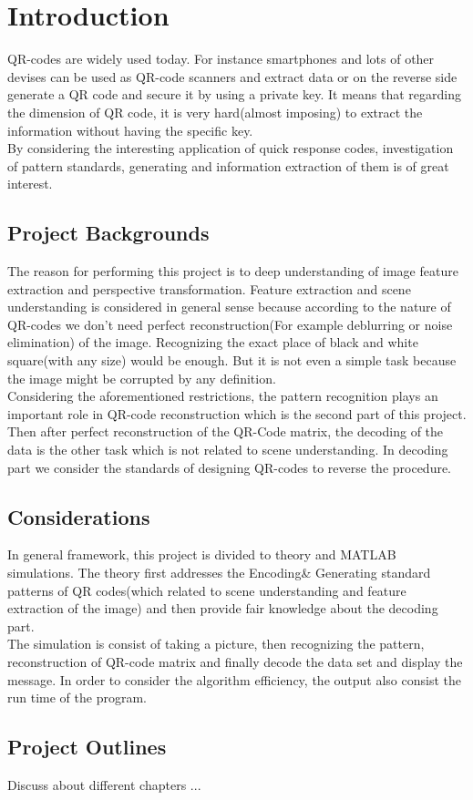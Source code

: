 \chapter{Introduction}

QR-codes are widely used today. For instance smartphones and lots of other devises can be used as QR-code scanners and extract data or on the reverse side generate a QR code and secure it by using a private key. It means that regarding the dimension of QR code, it is very hard(almost imposing) to extract the information without having the specific key.\\
By considering the interesting application of quick response codes, investigation of pattern standards, generating and information extraction of them is of great interest.


\section{Project Backgrounds}

The reason for performing this project is to deep understanding of image feature extraction and perspective transformation. Feature extraction and scene understanding is considered in general sense because according to the nature of QR-codes we don't need perfect reconstruction(For example deblurring or noise elimination) of the image. Recognizing the exact place of black and white square(with any size) would be enough. But it is not even a simple task because the image might be corrupted by any definition. \\
Considering the aforementioned restrictions, the pattern recognition plays an important role in QR-code reconstruction which is the second part of this project. Then after perfect reconstruction of the QR-Code matrix, the decoding of the data is the other task which is not related to scene understanding. In decoding part we consider the standards of designing QR-codes to reverse the procedure. 

\section{Considerations}

In general framework, this project is divided to theory and MATLAB simulations. The theory first addresses the Encoding\& Generating standard patterns of QR codes(which related to scene understanding and feature extraction of the image) and then provide fair knowledge about the decoding part. \\
The simulation is consist of taking a picture, then recognizing the pattern, reconstruction of QR-code matrix and finally decode the data set and display the message. In order to consider the algorithm efficiency, the output also consist the run time of the program.


\section{Project Outlines}

Discuss about different chapters ...
